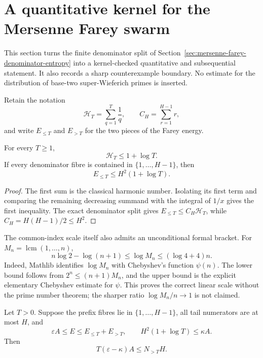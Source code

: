 \section{A quantitative kernel for the Mersenne Farey swarm}
\label{sec:mersenne-farey-quantitative-swarm}

This section turns the finite denominator split of
Section~\ref{sec:mersenne-farey-denominator-entropy} into a kernel-checked
quantitative and subsequential statement.  It also records a sharp
counterexample boundary.  No estimate for the distribution of base-two
super-Wieferich primes is inserted.

Retain the notation
\[
 \mathcal H_T=\sum_{q=1}^{T}\frac1q,
 \qquad C_H=\sum_{r=1}^{H-1}r,
\]
and write $E_{\le T}$ and $E_{>T}$ for the two pieces of the Farey energy.

\begin{proposition}
\label{prop:mersenne-harmonic-square-prefix}
For every $T\ge1$,
\[
 \mathcal H_T\le1+\log T.
\]
If every denominator fibre is contained in $\{1,\ldots,H-1\}$, then
\[
 E_{\le T}\le H^2(1+\log T).
\]
\end{proposition}

\begin{proof}
The first sum is the classical harmonic number.  Isolating its first term
and comparing the remaining decreasing summand with the integral of $1/x$
gives the first inequality.  The exact denominator split gives
$E_{\le T}\le C_H\mathcal H_T$, while
$C_H=H(H-1)/2\le H^2$.
\end{proof}

The common-index scale itself also admits an unconditional formal bracket.
For $M_n=\operatorname{lcm}(1,\ldots,n)$,
\[
 n\log2-\log(n+1)\le\log M_n\le(\log4+4)n.
\]
Indeed, Mathlib identifies $\log M_n$ with Chebyshev's function $\psi(n)$.
The lower bound follows from $2^n\le(n+1)M_n$, and the upper bound is the
explicit elementary Chebyshev estimate for $\psi$.  This proves the correct
linear scale without the prime number theorem; the sharper ratio
$\log M_n/n\to1$ is not claimed.

\begin{theorem}
\label{thm:mersenne-cleared-quantitative-swarm}
Let $T>0$.  Suppose the prefix fibres lie in
$\{1,\ldots,H-1\}$, all tail numerators are at most $H$, and
\[
 \varepsilon A\le E\le E_{\le T}+E_{>T},
 \qquad H^2(1+\log T)\le\kappa A.
\]
Then
\[
 T(\varepsilon-\kappa)A\le N_{>T}H.
\]
\end{theorem}

